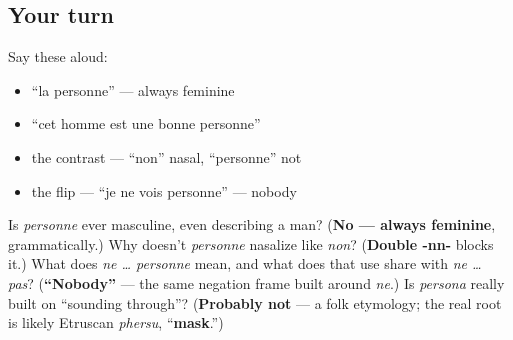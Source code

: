 \subsection*{Your turn}
Say these aloud:

\begin{itemize}
\raggedright
  \item \textquotedblleft{}la personne\textquotedblright{} — always feminine
  \item \textquotedblleft{}cet homme est une bonne personne\textquotedblright{}
  \item the contrast — \textquotedblleft{}non\textquotedblright{} nasal, \textquotedblleft{}personne\textquotedblright{} not
  \item the flip — \textquotedblleft{}je ne vois personne\textquotedblright{} — nobody
\end{itemize}

\begin{tcolorbox}[breakable,colback=teal!4,colframe=teal!35!black,title={Before you move on}]
Is \emph{personne} ever masculine, even describing a man? (\textbf{No — always feminine}, grammatically.) Why doesn't \emph{personne} nasalize like \emph{non}? (\textbf{Double -nn-} blocks it.) What does \emph{ne … personne} mean, and what does that use share with \emph{ne … pas}? (\textbf{\textquotedblleft{}Nobody\textquotedblright{}} — the same negation frame built around \emph{ne}.) Is \emph{persona} really built on \textquotedblleft{}sounding through\textquotedblright{}? (\textbf{Probably not} — a folk etymology; the real root is likely Etruscan \emph{phersu}, \textquotedblleft{}\textbf{mask}.\textquotedblright{})
\end{tcolorbox}
